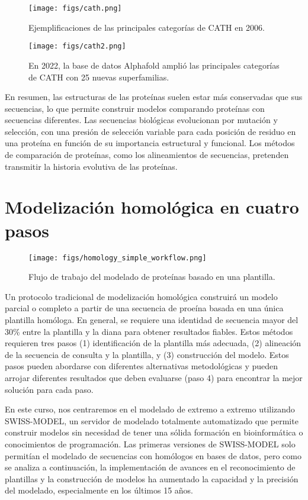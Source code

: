 \begin{figure}[h]
\centering
\texttt{[image: figs/cath.png]}
\caption{Ejemplificaciones de las principales categorías de CATH en 2006.}
\label{fig:cath}
\end{figure}

\begin{figure}[h]
\centering
\texttt{[image: figs/cath2.png]}
\caption{En 2022, la base de datos Alphafold amplió las principales categorías de CATH con 25 nuevas superfamilias.}
\label{fig:cath2}
\end{figure}

En resumen, las estructuras de las proteínas suelen estar más conservadas que sus secuencias, lo que permite construir modelos comparando proteínas con secuencias diferentes. Las secuencias biológicas evolucionan por mutación y selección, con una presión de selección variable para cada posición de residuo en una proteína en función de su importancia estructural y funcional. Los métodos de comparación de proteínas, como los alineamientos de secuencias, pretenden transmitir la historia evolutiva de las proteínas.

\section{Modelización homológica en cuatro pasos}
\begin{figure}[h]
\centering
\texttt{[image: figs/homology\_simple\_workflow.png]}
\caption{Flujo de trabajo del modelado de proteínas basado en una plantilla.}
\end{figure}

Un protocolo tradicional de modelización homológica construirá un modelo parcial o completo a partir de una secuencia de proeína basada en una única plantilla homóloga. En general, se requiere una identidad de secuencia mayor del 30\% entre la plantilla y la diana para obtener resultados fiables. Estos métodos requieren tres pasos (1) identificación de la plantilla más adecuada, (2) alineación de la secuencia de consulta y la plantilla, y (3) construcción del modelo. Estos pasos pueden abordarse con diferentes alternativas metodológicas y pueden arrojar diferentes resultados que deben evaluarse (paso 4) para encontrar la mejor solución para cada paso. 

En este curso, nos centraremos en el modelado de extremo a extremo utilizando SWISS-MODEL, un servidor de modelado totalmente automatizado que permite construir modelos sin necesidad de tener una sólida formación en bioinformática o conocimientos de programación. Las primeras versiones de SWISS-MODEL solo permitían el modelado de secuencias con homólogos en bases de datos, pero como se analiza a continuación, la implementación de avances en el reconocimiento de plantillas y la construcción de modelos ha aumentado la capacidad y la precisión del modelado, especialmente en los últimos 15 años.

